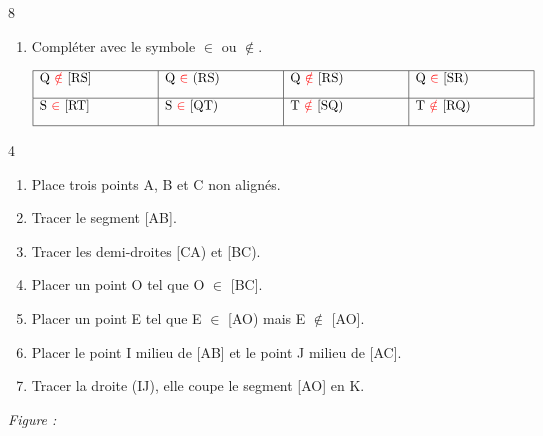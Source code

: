 \documentclass[a4paper]{book}
\begin{document}
{\begin{exerciceNote}{8}
\begin{enumerate}
                
            \item Compléter avec le symbole $\in$ ou $\notin$.
    
            \begin{center}
            \end{center}
    
            \begin{center}
                $\begin{array}{|p{3cm}|p{3cm}|p{3cm}|p{3cm}|}
                    \hline
                     Q \textcolor{red}{$\notin$} [RS] & Q \textcolor{red}{$\in$} (RS) & Q \textcolor{red}{$\notin$} [RS) & Q \textcolor{red}{$\in$} [SR)  \\[2ex] \hline
                     S \textcolor{red}{$\in$} [RT] & S \textcolor{red}{$\in$} [QT) & T \textcolor{red}{$\notin$} [SQ) & T \textcolor{red}{$\notin$} [RQ)  \\[2ex] \hline
                \end{array}$
            \end{center}
        \end{enumerate}
    \end{exerciceNote}


    \begin{exerciceNote}{4}
         \begin{minipage}{0.5\linewidth}
            \begin{enumerate}
                \item Place trois points A, B et C non alignés.
                \item Tracer le segment [AB].
                \item Tracer les demi-droites [CA) et [BC).
                \item Placer un point O tel que O $\in$ [BC].
                \item Placer un point E tel que E $\in$ [AO) mais E $\notin$ [AO].
                \item Placer le point I milieu de [AB] et le point J milieu de [AC].
                \item Tracer la droite (IJ), elle coupe le segment [AO] en K.
            \end{enumerate}
        \end{minipage}
        \vline
        \hfill
        \begin{minipage}{0.49\linewidth}
            \textit{Figure : }


\end{minipage}
\end{exerciceNote}}
\end{document}
